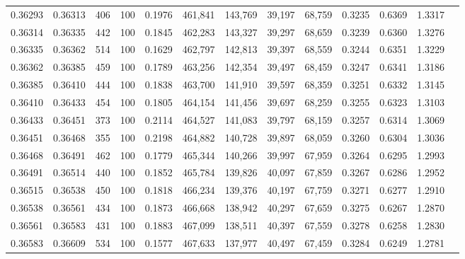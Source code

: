\begin{tabular}{rrrrrrrrrrrrr}
0.36293 & 0.36313 &    406 & 100 &                                     0.1976 & 461,841 & 143,769 &  39,197 &  68,759 & 0.3235 & 0.6369 & 1.3317 \\
0.36314 & 0.36335 &    442 & 100 &                                     0.1845 & 462,283 & 143,327 &  39,297 &  68,659 & 0.3239 & 0.6360 & 1.3276 \\
0.36335 & 0.36362 &    514 & 100 &                                     0.1629 & 462,797 & 142,813 &  39,397 &  68,559 & 0.3244 & 0.6351 & 1.3229 \\
0.36362 & 0.36385 &    459 & 100 &                                     0.1789 & 463,256 & 142,354 &  39,497 &  68,459 & 0.3247 & 0.6341 & 1.3186 \\
0.36385 & 0.36410 &    444 & 100 &                                     0.1838 & 463,700 & 141,910 &  39,597 &  68,359 & 0.3251 & 0.6332 & 1.3145 \\
0.36410 & 0.36433 &    454 & 100 &                                     0.1805 & 464,154 & 141,456 &  39,697 &  68,259 & 0.3255 & 0.6323 & 1.3103 \\
0.36433 & 0.36451 &    373 & 100 &                                     0.2114 & 464,527 & 141,083 &  39,797 &  68,159 & 0.3257 & 0.6314 & 1.3069 \\
0.36451 & 0.36468 &    355 & 100 &                                     0.2198 & 464,882 & 140,728 &  39,897 &  68,059 & 0.3260 & 0.6304 & 1.3036 \\
0.36468 & 0.36491 &    462 & 100 &                                     0.1779 & 465,344 & 140,266 &  39,997 &  67,959 & 0.3264 & 0.6295 & 1.2993 \\
0.36491 & 0.36514 &    440 & 100 &                                     0.1852 & 465,784 & 139,826 &  40,097 &  67,859 & 0.3267 & 0.6286 & 1.2952 \\
0.36515 & 0.36538 &    450 & 100 &                                     0.1818 & 466,234 & 139,376 &  40,197 &  67,759 & 0.3271 & 0.6277 & 1.2910 \\
0.36538 & 0.36561 &    434 & 100 &                                     0.1873 & 466,668 & 138,942 &  40,297 &  67,659 & 0.3275 & 0.6267 & 1.2870 \\
0.36561 & 0.36583 &    431 & 100 &                                     0.1883 & 467,099 & 138,511 &  40,397 &  67,559 & 0.3278 & 0.6258 & 1.2830 \\
0.36583 & 0.36609 &    534 & 100 &                                     0.1577 & 467,633 & 137,977 &  40,497 &  67,459 & 0.3284 & 0.6249 & 1.2781 \\

\end{tabular}
